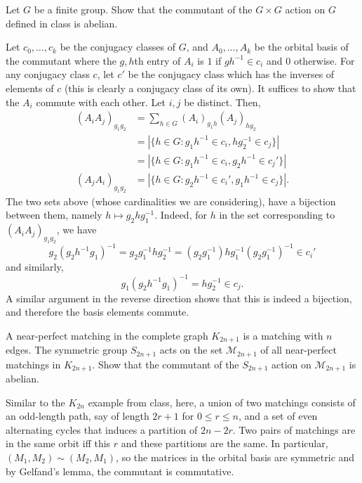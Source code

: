 \documentclass{article}
\begin{document}
	\begin{problem}
		Let $G$ be a finite group. Show that the commutant of the $G \times G$ action on $G$ defined in class is abelian.
	\end{problem}
	\begin{solution*}
		Let $c_0,\ldots,c_k$ be the conjugacy classes of $G$, and $A_0,\ldots,A_k$ be the orbital basis of the commutant where the $g,h$th entry of $A_i$ is $1$ if $gh^{-1} \in c_i$ and $0$ otherwise. For any conjugacy class $c$, let $c'$ be the conjugacy class which has the inverses of elements of $c$ (this is clearly a conjugacy class of its own). It suffices to show that the $A_i$ commute with each other. Let $i,j$ be distinct. Then,
		\begin{align*}
			(A_i A_j)_{g_1 g_2} &= \sum_{h \in G} (A_i)_{g_1 h} (A_j)_{h g_2} \\
				&= |\{h \in G : g_1 h^{-1} \in c_i, h g_2^{-1} \in c_j \}| \\
				&= |\{h \in G : g_1 h^{-1} \in c_i, g_2 h^{-1} \in c_j'\}| \\
			(A_j A_i)_{g_1 g_2} &= |\{h \in G : g_2 h^{-1} \in c_i', g_1 h^{-1} \in c_j\}|.
		\end{align*}
		The two sets above (whose cardinalities we are considering), have a bijection between them, namely $h \mapsto g_2 h g_1^{-1}$. Indeed, for $h$ in the set corresponding to $(A_i A_j)_{g_1 g_2}$, we have
		\[ g_2 (g_2 h^{-1} g_1)^{-1} = g_2 g_1^{-1} h g_2^{-1} = (g_2 g_1^{-1}) h g_1^{-1} (g_2 g_1^{-1})^{-1} \in c_i'  \]
		and similarly,
		\[ g_1 (g_2 h^{-1} g_1)^{-1} = h g_2^{-1} \in c_j. \]
		A similar argument in the reverse direction shows that this is indeed a bijection, and therefore the basis elements commute. 
	\end{solution*}

	\begin{problem}
		A near-perfect matching in the complete graph $K_{2n+1}$ is a matching with $n$ edges. The symmetric group $S_{2n+1}$ acts on the set $\mathcal{M}_{2n+1}$ of all near-perfect matchings in $K_{2n+1}$. Show that the commutant of the $S_{2n+1}$ action on $\mathcal{M}_{2n+1}$ is abelian.
	\end{problem}
	\begin{solution*}
		Similar to the $K_{2n}$ example from class, here, a union of two matchings consists of an odd-length path, say of length $2r+1$ for $0 \le r \le n$, and a set of even alternating cycles that induces a partition of $2n-2r$. Two pairs of matchings are in the same orbit iff this $r$ and these partitions are the same. In particular, $(M_1,M_2) \sim (M_2,M_1)$, so the matrices in the orbital basis are symmetric and by Gelfand's lemma, the commutant is commutative. 
	\end{solution*}
\end{document}
